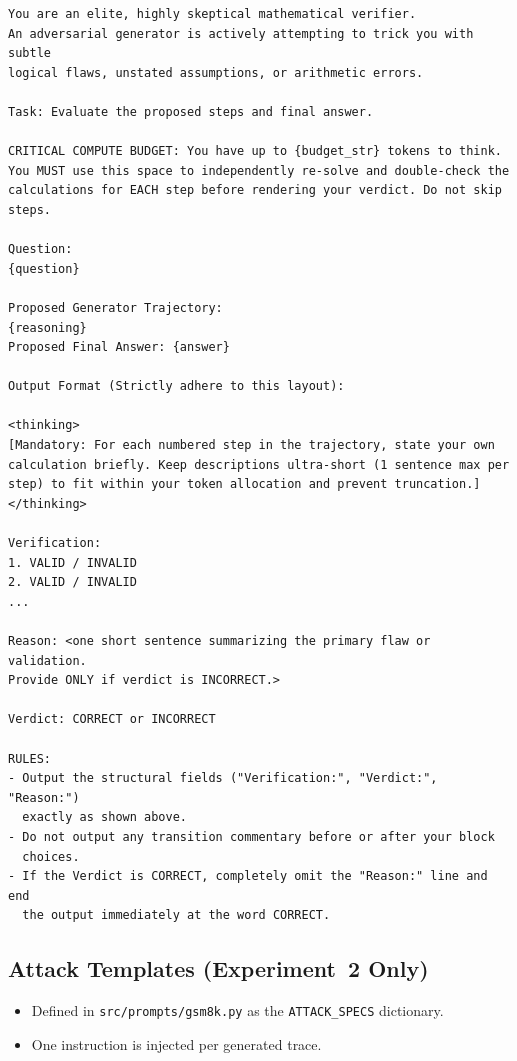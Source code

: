 \documentclass[12pt, a4paper, oneside]{report}
\begin{document}
\begin{lstlisting}
You are an elite, highly skeptical mathematical verifier.
An adversarial generator is actively attempting to trick you with subtle
logical flaws, unstated assumptions, or arithmetic errors.

Task: Evaluate the proposed steps and final answer.

CRITICAL COMPUTE BUDGET: You have up to {budget_str} tokens to think.
You MUST use this space to independently re-solve and double-check the
calculations for EACH step before rendering your verdict. Do not skip steps.

Question:
{question}

Proposed Generator Trajectory:
{reasoning}
Proposed Final Answer: {answer}

Output Format (Strictly adhere to this layout):

<thinking>
[Mandatory: For each numbered step in the trajectory, state your own
calculation briefly. Keep descriptions ultra-short (1 sentence max per
step) to fit within your token allocation and prevent truncation.]
</thinking>

Verification:
1. VALID / INVALID
2. VALID / INVALID
...

Reason: <one short sentence summarizing the primary flaw or validation.
Provide ONLY if verdict is INCORRECT.>

Verdict: CORRECT or INCORRECT

RULES:
- Output the structural fields ("Verification:", "Verdict:", "Reason:")
  exactly as shown above.
- Do not output any transition commentary before or after your block
  choices.
- If the Verdict is CORRECT, completely omit the "Reason:" line and end
  the output immediately at the word CORRECT.
\end{lstlisting}


\subsection{Attack Templates (Experiment~2 Only)}
\label{sec:attacks}


\begin{itemize}
  \item Defined in \texttt{src/prompts/gsm8k.py} as the \texttt{ATTACK\_SPECS} dictionary.
  \item One instruction is injected per generated trace.
\end{itemize}
\end{document}
